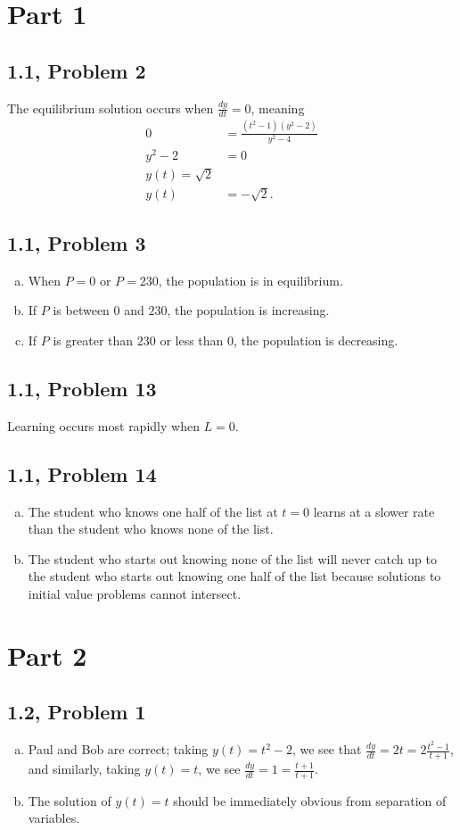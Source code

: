 \documentclass[10pt]{mypackage}
\begin{document}
\section{Part 1}%
\subsection{1.1, Problem 2}%
The equilibrium solution occurs when $\frac{dy}{dt} = 0$, meaning
\begin{align*}
  0 &= \frac{\left(t^2 - 1\right)\left(y^2 - 2\right)}{y^2 - 4}\\
  y^2 - 2 &= 0\\
  y(t) = \sqrt{2}\\
  y(t) &= -\sqrt{2}.
\end{align*}
\subsection{1.1, Problem 3}%
\begin{enumerate}[(a)]
  \item When $P = 0$ or $P = 230$, the population is in equilibrium.
  \item If $P$ is between $0$ and $230$, the population is increasing.
  \item If $P$ is greater than $230$ or less than $0$, the population is decreasing.
\end{enumerate}
\subsection{1.1, Problem 13}%
Learning occurs most rapidly when $L = 0$.
\subsection{1.1, Problem 14}%
\begin{enumerate}[(a)]
  \item The student who knows one half of the list at $t=0$ learns at a slower rate than the student who knows none of the list.
  \item The student who starts out knowing none of the list will never catch up to the student who starts out knowing one half of the list because solutions to initial value problems cannot intersect.
\end{enumerate}
\section{Part 2}%
\subsection{1.2, Problem 1}%
\begin{enumerate}[(a)]
  \item Paul and Bob are correct; taking $y(t) = t^2 - 2$, we see that $\frac{dy}{dt} = 2t = 2\frac{t^2 - 1}{t+1}$, and similarly, taking $y(t) = t$, we see $\frac{dy}{dt} = 1 = \frac{t+1}{t+1}$.
  \item The solution of $y(t) = t$ should be immediately obvious from separation of variables.
\end{enumerate}
\end{document}
